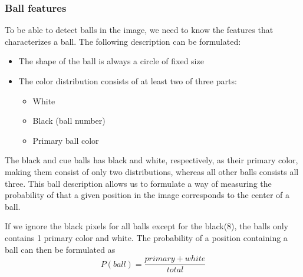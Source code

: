 \subsubsection{Ball features}
To be able to detect balls in the image, we need to know the features that characterizes a ball. The following description can be formulated:
\begin{itemize}
\item The shape of the ball is always a circle of fixed size
\item The color distribution consists of at least two of three parts:
	\begin{itemize}
		\item White
		\item Black (ball number)
		\item Primary ball color
	\end{itemize}
\end{itemize}
The black and cue balls has black and white, respectively, as their primary color, making them consist of only two distributions, whereas all other balls consists all three. This ball description allows us to formulate a way of measuring the probability of that a given position in the image corresponds to the center of a ball.

If we ignore the black pixels for all balls except for the black(8), the balls only contains 1 primary color and white. The probability of a position containing a ball can then be formulated as
\begin{equation}
P(ball) = \frac{primary + white}{total}
\end{equation}
